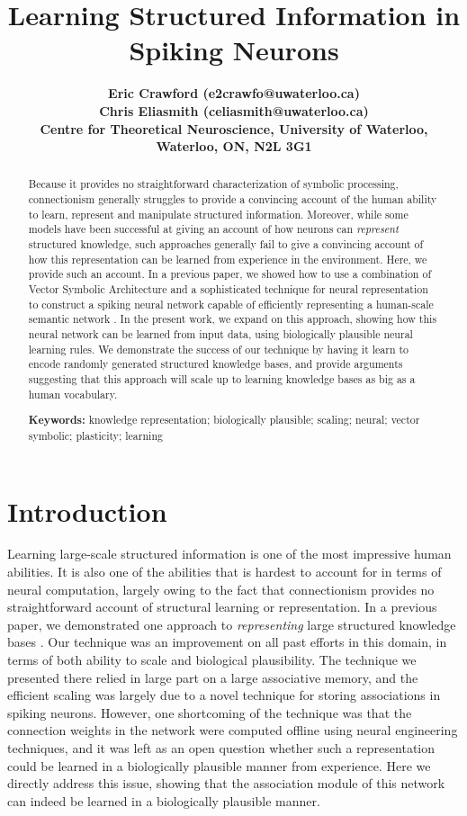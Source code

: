 \documentclass[10pt,letterpaper]{article}
\title{Learning Structured Information in Spiking Neurons}
\author{\large \bf Eric Crawford (e2crawfo@uwaterloo.ca)\\
  \large \bf Chris Eliasmith (celiasmith@uwaterloo.ca)\\
  Centre for Theoretical Neuroscience, University of Waterloo,
  Waterloo, ON, N2L 3G1}
\begin{document}

\maketitle

\begin{abstract}
Because it provides no straightforward characterization of symbolic processing, connectionism generally struggles to provide a convincing account of the human ability to learn, represent and manipulate structured information. Moreover, while some models have been successful at giving an account of how neurons can \textit{represent} structured knowledge, such approaches generally fail to give a convincing account of how this representation can be learned from experience in the environment. Here, we provide such an account. In a previous paper, we showed how to use a combination of Vector Symbolic Architecture and a sophisticated technique for neural representation to construct a spiking neural network capable of efficiently representing a human-scale semantic network \citep{crawford2013}. In the present work, we expand on this approach, showing how this neural network can be learned from input data, using biologically plausible neural learning rules. We demonstrate the success of our technique by having it learn to encode randomly generated structured knowledge bases, and provide arguments suggesting that this approach will scale up to learning knowledge bases as big as a human vocabulary.

\textbf{Keywords:} 
knowledge representation; biologically plausible; scaling; neural; vector symbolic; plasticity; learning
\end{abstract}

\section{Introduction}
Learning large-scale structured information is one of the most impressive human abilities. It is also one of the abilities that is hardest to account for in terms of neural computation, largely owing to the fact that connectionism provides no straightforward account of structural learning or representation. In a previous paper, we demonstrated one approach to \textit{representing} large structured knowledge bases \citep{crawford2013}. Our technique was an improvement on all past efforts in this domain, in terms of both ability to scale and biological plausibility. The technique we presented there relied in large part on a large associative memory, and the efficient scaling was largely due to a novel technique for storing associations in spiking neurons. However, one shortcoming of the technique was that the connection weights in the network were computed offline using neural engineering techniques, and it was left as an open question whether such a representation could be learned in a biologically plausible manner from experience. Here we directly address this issue, showing that the association module of this network can indeed be learned in a biologically plausible manner.
\end{document}
